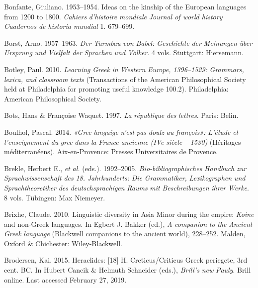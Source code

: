 \documentclass[output=paper]{langsci/langscibook}
\begin{document}
Bonfante, Giuliano. 1953–1954. Ideas on the kinship of the European languages from 1200 to 1800. \textit{Cahiers} \textit{d’histoire} \textit{mondiale} \textit{{\textbar} Journal of world history {\textbar} Cuadernos de historia mundial} 1. 679–699.

Borst, Arno. 1957–1963. \textit{Der} \textit{Turmbau} \textit{von} \textit{Babel:} \textit{Geschichte} \textit{der} \textit{Meinungen} \textit{über} \textit{Ursprung} \textit{und} \textit{Vielfalt} \textit{der} \textit{Sprachen} \textit{und} \textit{Völker}. 4 vols. Stuttgart: Hiersemann.

Botley, Paul. 2010. \textit{Learning} \textit{Greek} \textit{in} \textit{Western} \textit{Europe,} \textit{1396–1529:} \textit{Grammars,} \textit{lexica,} \textit{and} \textit{classroom} \textit{texts} (Transactions of the American Philosophical Society held at Philadelphia for promoting useful knowledge 100.2). Philadelphia: American Philosophical Society.

Bots, Hans \& Françoise Waquet. 1997. \textit{La} \textit{république} \textit{des} \textit{lettres}. Paris: Belin.

Boulhol, Pascal. 2014. \textit{«Grec} \textit{langaige} \textit{n’est} \textit{pas} \textit{doulz} \textit{au} \textit{françois»:} \textit{L’étude} \textit{et} \textit{l’enseignement} \textit{du} \textit{grec} \textit{dans} \textit{la} \textit{France} \textit{ancienne} \textit{(IVe} \textit{siècle} \textit{–} \textit{1530)} (Héritages méditerranéens). Aix-en-Provence: Presses Universitaires de Provence.

Brekle, Herbert E., \textit{et} \textit{al.} (eds.). 1992–2005. \textit{Bio-bibliographisches} \textit{Handbuch} \textit{zur} \textit{Sprachwissenschaft} \textit{des} \textit{18.} \textit{Jahrhunderts:} \textit{Die} \textit{Grammatiker,} \textit{Lexikographen} \textit{und} \textit{Sprachtheoretiker} \textit{des} \textit{deutschsprachigen} \textit{Raums} \textit{mit} \textit{Beschreibungen} \textit{ihrer} \textit{Werke}. 8 vols. Tübingen: Max Niemeyer.

Brixhe, Claude. 2010. Linguistic diversity in Asia Minor during the empire: \textit{Koine} and non-Greek languages. In Egbert J. Bakker (ed.), \textit{A} \textit{companion} \textit{to} \textit{the} \textit{Ancient} \textit{Greek} \textit{language} (Blackwell companions to the ancient world), 228–252. Malden, Oxford \& Chichester: Wiley-Blackwell.

Brodersen, Kai. 2015. Heraclides: [18] H. Creticus/Criticus Greek periegete, 3rd cent. BC. In Hubert Cancik \& Helmuth Schneider (eds.), \textit{Brill’s} \textit{new} \textit{Pauly}. Brill online. Last accessed February 27, 2019.
\end{document}
